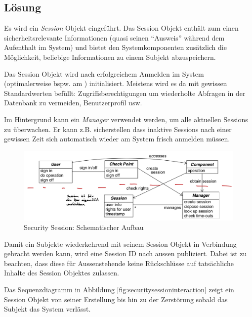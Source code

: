 \subsection*{Lösung}
Es wird ein \emph{Session} Objekt eingeführt. Das Session Objekt enthält zum einen sicherheitsrelevante Informationen (quasi seinen ``Ausweis'' während dem Aufenthalt im System) und bietet den Systemkomponenten zusätzlich die Möglichkeit, beliebige Informationen zu einem Subjekt abzuspeichern.

Das Session Objekt wird nach erfolgreichem Anmelden im System (optimalerweise bspw. am ) initialisiert. Meistens wird es da mit gewissen Standardwerten befüllt: Zugriffsberechtigungen um wiederholte Abfragen in der Datenbank zu vermeiden, Benutzerprofil usw.

Im Hintergrund kann ein \emph{Manager} verwendet werden, um alle aktuellen Sessions zu überwachen. Er kann z.B. sicherstellen dass inaktive Sessions nach einer gewissen Zeit sich automatisch wieder am System frisch anmelden müssen.

\begin{figure}[H]
	\includegraphics[width=\textwidth]{content/security/system-access-control-architecture/images/security-session-structure.png}
	\caption{Security Session: Schematischer Aufbau \cite{SecPatterns06}}
\end{figure}

Damit ein Subjekte wiederkehrend mit seinem Session Objekt in Verbindung gebracht werden kann, wird eine Session ID nach aussen publiziert. Dabei ist zu beachten, dass diese für Aussenstehende keine Rückschlüsse auf tatsächliche Inhalte des Session Objektes zulassen.

Das Sequenzdiagramm in Abbildung \ref{fig:securitysessioninteraction} zeigt ein Session Objekt von seiner Erstellung bis hin zu der Zerstörung sobald das Subjekt das System verlässt.

